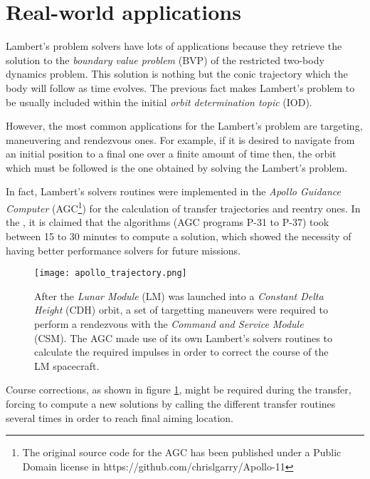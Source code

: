 \newpage
\section{Real-world applications}
\label{sec:applications}

Lambert's problem solvers have lots of applications because they retrieve the
solution to the \textit{boundary value problem} (BVP) of the restricted two-body
dynamics problem.  This solution is nothing but the conic trajectory which the
body will follow as time evolves. The previous fact makes Lambert's problem to be
usually included within the initial \textit{orbit determination topic} (IOD).

However, the most common applications for the Lambert's problem are targeting,
maneuvering and rendezvous ones. For example, if it is desired to navigate from
an initial position to a final one over a finite amount of time then, the orbit
which must be followed is the one obtained by solving the Lambert's problem.

In fact, Lambert's solvers routines were implemented in the \textit{Apollo
  Guidance Computer} (AGC\footnote{The original source code for the AGC has been
  published under a Public Domain license in
  https://github.com/chrislgarry/Apollo-11}) for the calculation of transfer
trajectories and reentry ones. In the , it is claimed that
the algorithms (AGC programs P-31 to P-37) took between 15 to 30 minutes to
compute a solution, which showed the necessity of having better performance
solvers for future missions.

\vspace{0.5cm}
\begin{figure}[h]
  \centering
  \texttt{[image: apollo\_trajectory.png]}
  \caption{After the \textit{Lunar Module} (LM) was launched into a
    \textit{Constant Delta Height} (CDH) orbit, a set of targetting
    maneuvers were required to perform a rendezvous with the \textit{Command
      and Service Module} (CSM). The AGC made use of its own Lambert's
    solvers routines to calculate the required impulses in order to correct
    the course of the LM spacecraft.}
  \label{fig:apollo_trajectory}
\end{figure}

Course corrections, as shown in figure \ref{fig:apollo_trajectory}, might be
required during the transfer, forcing to compute a new solutions by calling the
different transfer routines several times in order to reach final aiming
location.

